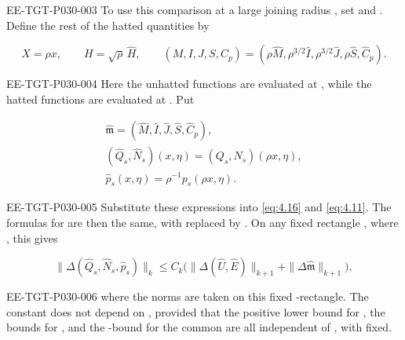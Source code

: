 \begin{EESegment}{EE-TGT-P030-003}
To use this comparison at a large joining radius
, set
 and
. Define the rest of
the hatted quantities by
\end{EESegment}
\begin{equation}
 X=\rho x,\qquad H=\sqrt\rho\,\widehat H,\qquad
 (M,I,J,S,C_p)
   =(\rho\widehat M,\rho^{3/2}\widehat I,\rho^{3/2}\widehat J,
     \rho\widehat S,\widehat C_p).
\tag{4.19}\label{eq:4.19}
\end{equation}
\begin{EESegment}{EE-TGT-P030-004}
Here the unhatted functions are evaluated at
, while the hatted functions are evaluated
at . Put
\end{EESegment}
\[
\begin{gathered}
 \widehat{\mathfrak m}
   =(\widehat M,\widehat I,\widehat J,\widehat S,\widehat C_p),\\
 (\widehat Q_s,\widehat N_s)(x,\eta)=(Q_s,N_s)(\rho x,\eta),\\
 \widehat p_s(x,\eta)=\rho^{-1}p_s(\rho x,\eta).
\end{gathered}
\]
\begin{EESegment}{EE-TGT-P030-005}
Substitute these expressions into \eqref{eq:4.16} and \eqref{eq:4.11}.
The formulas for
 are then the
same, with  replaced by
. On any fixed rectangle
, where
, this gives
\end{EESegment}
\[
 \|\Delta(\widehat Q_s,\widehat N_s,\widehat p_s)\|_k
 \leq C_k\bigl(\|\Delta(\widehat U,\widehat E)\|_{k+1}
                 +\|\Delta\widehat{\mathfrak m}\|_{k+1}\bigr),
\]
\begin{EESegment}{EE-TGT-P030-006}
where the norms are taken on this fixed
-rectangle. The constant does not depend on
, provided that the positive lower bound for
, the bounds for
, and the
-bound for the common
 are all independent of
, with  fixed.
\end{EESegment}

